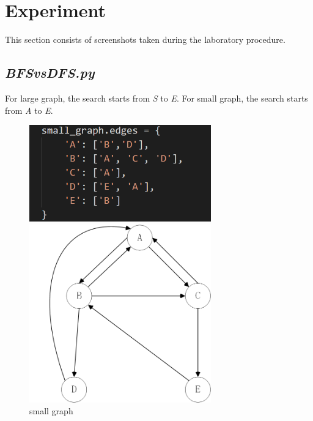 \documentclass[aps,letterpaper,10pt]{revtex4}
\begin{document}
\newpage
\section{Experiment}
This section consists of screenshots taken during the laboratory procedure. 

\subsection{\emph{BFSvsDFS.py}}

For large graph, the search starts from \emph{S} to \emph{E}. For small graph,  the search starts from \emph{A} to \emph{E}.

\begin{figure}[h]
	\begin{minipage}[c]{0.4\textwidth} %
		\centering
		\includegraphics[width=0.7\textwidth]{small_graph.png} %
	\end{minipage}%
	\begin{minipage}[c]{0.4\textwidth} %
		\centering
		\includegraphics[width=0.7\textwidth]{small_graph_visual.png} %
		
	\end{minipage}%
	\caption{small graph}
\end{figure}
\end{document}

